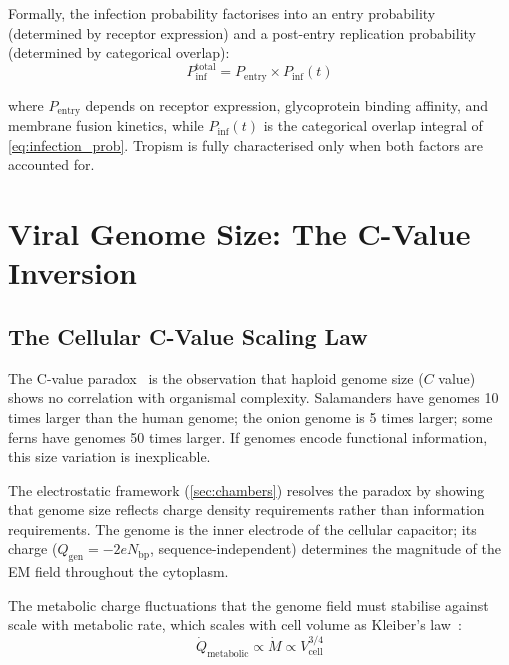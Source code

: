 \documentclass[11pt,twocolumn,a4paper]{article}
\theoremstyle{definition}
\theoremstyle{remark}
\newcommand{\Qgen}{Q_{\mathrm{gen}}}
\begin{document}
Formally, the infection probability factorises into an entry probability (determined by receptor expression) and a post-entry replication probability (determined by categorical overlap):
\begin{equation}
  P_{\mathrm{inf}}^{\mathrm{total}} = P_{\mathrm{entry}} \times P_{\mathrm{inf}}(t)
  \label{eq:total_infection}
\end{equation}

where $P_{\mathrm{entry}}$ depends on receptor expression, glycoprotein binding affinity, and membrane fusion kinetics, while $P_{\mathrm{inf}}(t)$ is the categorical overlap integral of \cref{eq:infection_prob}. Tropism is fully characterised only when both factors are accounted for.

\section{Viral Genome Size: The C-Value Inversion}
\label{sec:cvalue}

\subsection{The Cellular C-Value Scaling Law}

The C-value paradox~\cite{Thomas1971,Gregory2001} is the observation that haploid genome size ($C$ value) shows no correlation with organismal complexity. Salamanders have genomes 10 times larger than the human genome; the onion genome is 5 times larger; some ferns have genomes 50 times larger. If genomes encode functional information, this size variation is inexplicable.

The electrostatic framework (\cref{sec:chambers}) resolves the paradox by showing that genome size reflects charge density requirements rather than information requirements. The genome is the inner electrode of the cellular capacitor; its charge ($\Qgen = -2e N_{\mathrm{bp}}$, sequence-independent) determines the magnitude of the EM field throughout the cytoplasm.

The metabolic charge fluctuations that the genome field must stabilise against scale with metabolic rate, which scales with cell volume as Kleiber's law~\cite{Kleiber1932,West1997}:
\begin{equation}
  \dot{Q}_{\mathrm{metabolic}} \propto \dot{M} \propto V_{\mathrm{cell}}^{3/4}
  \label{eq:kleiber}
\end{equation}
\end{document}
